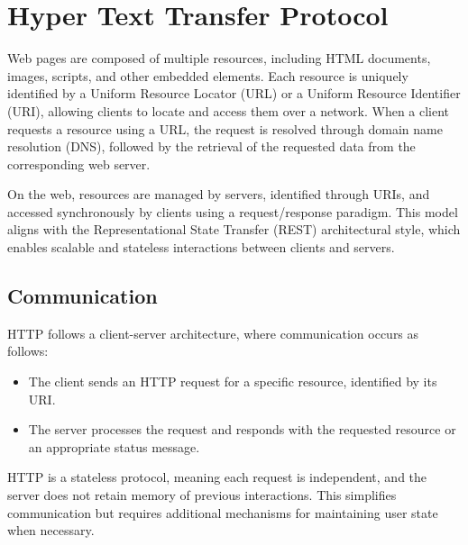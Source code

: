 \section{Hyper Text Transfer Protocol}

Web pages are composed of multiple resources, including HTML documents, images, scripts, and other embedded elements. 
Each resource is uniquely identified by a Uniform Resource Locator (URL) or a Uniform Resource Identifier (URI), allowing clients to locate and access them over a network.
When a client requests a resource using a URL, the request is resolved through domain name resolution (DNS), followed by the retrieval of the requested data from the corresponding web server.

On the web, resources are managed by servers, identified through URIs, and accessed synchronously by clients using a request/response paradigm.
This model aligns with the Representational State Transfer (REST) architectural style, which enables scalable and stateless interactions between clients and servers.


\subsection{Communication}
HTTP follows a client-server architecture, where communication occurs as follows:
\begin{itemize}
    \item The client sends an HTTP request for a specific resource, identified by its URI.
    \item The server processes the request and responds with the requested resource or an appropriate status message.
\end{itemize}
HTTP is a stateless protocol, meaning each request is independent, and the server does not retain memory of previous interactions. 
This simplifies communication but requires additional mechanisms for maintaining user state when necessary.


